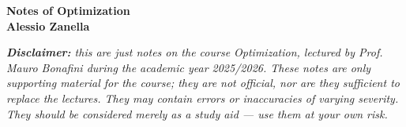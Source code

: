 \documentclass[12pt, openany]{scrbook}
\begin{document}
\frontmatter

\begin{titlepage}
    \begin{center}
        \LARGE
        \textbf{Notes of Optimization} \\
        \vfill
        \normalsize
        \textbf{Alessio Zanella} \\
    \end{center}
\end{titlepage}

\pagebreak

\color{blue}\textit{\textbf{Disclaimer:} this are just notes on the course Optimization, lectured by Prof. Mauro Bonafini during the academic year 2025/2026. These notes are only supporting material for the course; they are not official, nor are they sufficient to replace the lectures. They may contain errors or inaccuracies of varying severity. They should be considered merely as a study aid — use them at your own risk.}\color{black}

\tableofcontents

\mainmatter























\end{document}
